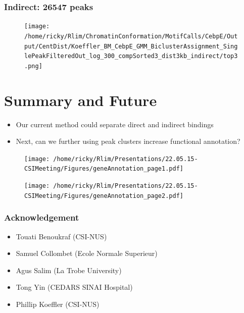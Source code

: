 \documentclass[notes]{beamer}
\begin{document}
\begin{frame}[plain]
    \frametitle{Indirect: 26547 peaks}
    \begin{figure}
        \texttt{[image: /home/ricky/Rlim/ChromatinConformation/MotifCalls/CebpE/Output/CentDist/Koeffler\_BM\_CebpE\_GMM\_BiclusterAssignment\_SinglePeakFilteredOut\_log\_300\_compSorted3\_dist3kb\_indirect/top3.png]}
    \end{figure}
\end{frame}

\section{Summary and Future}
    \begin{frame}
        \begin{itemize}[<+->]
            \item Our current method could separate direct and indirect bindings 
            \item Next, can we further using peak clusters increase functional annotation?
        \end{itemize}
    \end{frame} 

\begin{frame}[plain]
    \begin{figure}
        \texttt{[image: /home/ricky/Rlim/Presentations/22.05.15-CSIMeeting/Figures/geneAnnotation\_page1.pdf]}
    \end{figure}
\end{frame}

\begin{frame}[plain]
    \begin{figure}
        \texttt{[image: /home/ricky/Rlim/Presentations/22.05.15-CSIMeeting/Figures/geneAnnotation\_page2.pdf]}
    \end{figure}
\end{frame}

\begin{frame}[plain]
    \frametitle{Acknowledgement}
    \begin{itemize}
        \item Touati Benoukraf (CSI-NUS)
        \item Samuel Collombet (Ecole Normale Superieur)
        \item Agus Salim (La Trobe University)
        \item Tong Yin (CEDARS SINAI Hospital)
        \item Phillip Koeffler (CSI-NUS)
    \end{itemize}
\end{frame}
\end{document}
